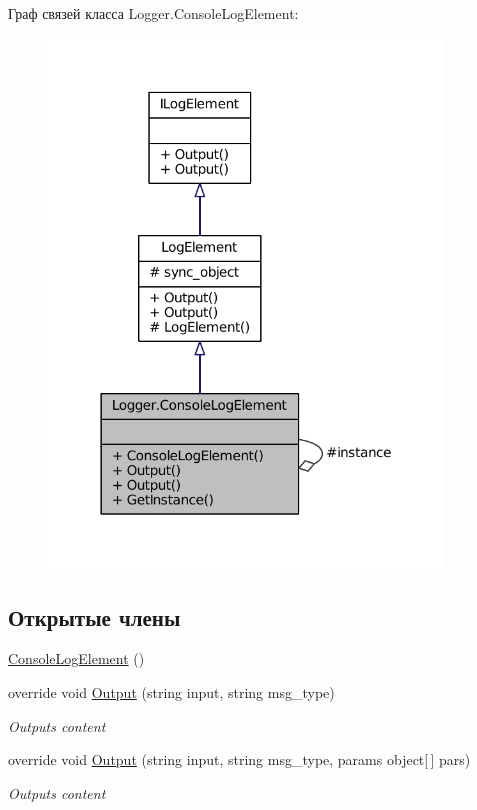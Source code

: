 Граф связей класса Logger.\+Console\+Log\+Element\+:
\nopagebreak
\begin{figure}[H]
\begin{center}
\leavevmode
\includegraphics[width=298pt]{class_logger_1_1_console_log_element__coll__graph}
\end{center}
\end{figure}
\subsection*{Открытые члены}
\begin{DoxyCompactItemize}
\item 
\hyperlink{class_logger_1_1_console_log_element_abd95daede783db17268ee547de7b8f47}{Console\+Log\+Element} ()
\item 
override void \hyperlink{class_logger_1_1_console_log_element_ad36d55bbf34d2b9726fddb7a96e3d5e1}{Output} (string input, string msg\+\_\+type)
\begin{DoxyCompactList}\small\item\em Outputs content \end{DoxyCompactList}\item 
override void \hyperlink{class_logger_1_1_console_log_element_ae373fa855a7146b970afe22ddd184048}{Output} (string input, string msg\+\_\+type, params object\mbox{[}$\,$\mbox{]} pars)
\begin{DoxyCompactList}\small\item\em Outputs content \end{DoxyCompactList}\end{DoxyCompactItemize}
